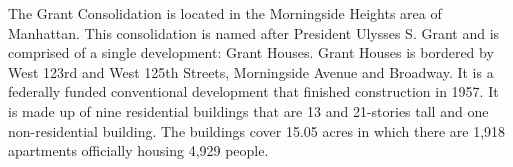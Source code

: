 The Grant Consolidation is located in the Morningside Heights area of Manhattan. This consolidation is named after President Ulysses S. Grant and is comprised of a single development: Grant Houses. Grant Houses is bordered by West 123rd and West 125th Streets, Morningside Avenue and Broadway. It is a federally funded conventional development that finished construction in 1957. It is made up of nine residential buildings that are 13 and 21-stories tall and one non-residential building. The buildings cover 15.05 acres in which there are 1,918 apartments officially housing 4,929 people.
